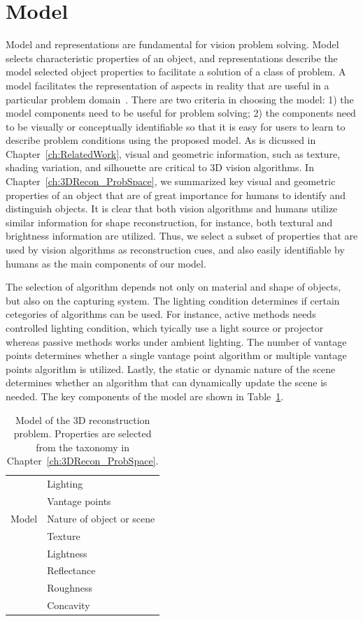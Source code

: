 \section{Model}
\label{sec:3DRecon_Model}
Model and representations are fundamental for vision problem solving. Model selects characteristic properties of an object, and representations describe the model selected object properties to facilitate a solution of a class of problem. A model facilitates the representation of aspects in reality that are useful in a particular problem domain~\cite{bolles19863dpo}. There are two criteria in choosing the model: 1) the model components need to be useful for problem solving; 2) the components need to be visually or conceptually identifiable so that it is easy for users to learn to describe problem conditions using the proposed model. As is dicussed in Chapter~\ref{ch:RelatedWork}, visual and geometric information, such as texture, shading variation, and silhouette are critical to 3D vision algorithms. In Chapter~\ref{ch:3DRecon_ProbSpace}, we summarized key visual and geometric properties of an object that are of great importance for humans to identify and distinguish objects. It is clear that both vision algorithms and humans utilize similar information for shape reconstruction, for instance, both textural and brightness information are utilized. Thus, we select a subset of properties that are used by vision algorithms as reconstruction cues, and also easily identifiable by humans as the main components of our model.

The selection of algorithm depends not only on material and shape of objects, but also on the capturing system. The lighting condition determines if certain cetegories of algorithms can be used. For instance, active methods needs controlled lighting condition, which tyically use a light source or projector whereas passive methods works under ambient lighting. The number of vantage points determines whether a single vantage point algorithm or multiple vantage points algorithm is utilized. Lastly, the static or dynamic nature of the scene determines whether an algorithm that can dynamically update the scene is needed. The key components of the model are shown in Table~\ref{tab:3DRecon_model}.
\begin{table}[!htbp]
  \centering
  \begin{tabular}{l|l}
  \toprule
  \multirow{5}{*}{Model} 
  & Lighting \\
  & Vantage points \\
  & Nature of object or scene \\
  & Texture \\
  & Lightness \\
  & Reflectance \\
  & Roughness \\
  & Concavity \\
  \bottomrule
  \end{tabular}
  \caption{Model of the 3D reconstruction problem. Properties are selected from the taxonomy in Chapter~\ref{ch:3DRecon_ProbSpace}.}
  \label{tab:3DRecon_model}
\end{table}

